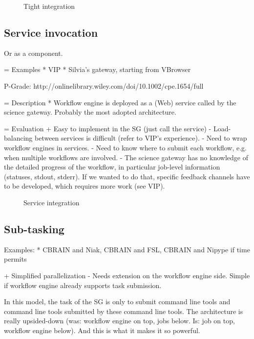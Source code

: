 \documentclass[preprint,3p,twocolumn]{elsarticle}
\begin{document}
\begin{figure}
\centering
\def\svgwidth{0.5\columnwidth}

\label{archi:tight}
\caption{Tight integration}
\end{figure}

\subsection{Service invocation}

Or as a component.

= Examples
* VIP
* Silvia's gateway, starting from VBrowser

P-Grade: http://onlinelibrary.wiley.com/doi/10.1002/cpe.1654/full

= Description 
*  Workflow engine is deployed as a (Web) service called by the
science gateway. Probably the most adopted architecture. 

= Evaluation
+ Easy to implement in the SG (just call the service)
- Load-balancing between services is difficult
(refer to VIP's experience).
- Need to wrap workflow engines in
services.
- Need to know where to submit each workflow, e.g. when
multiple workflows are involved.
- The science gateway has no
knowledge of the detailed progress of the workflow, in particular
job-level information (statuses, stdout, stderr). If we wanted to do
that, specific feedback channels have to be developed, which requires more work (see VIP).

\begin{figure}
\centering
\def\svgwidth{0.5\columnwidth}

\label{archi:service}
\caption{Service integration}
\end{figure}


\subsection{Sub-tasking}

Examples:
* CBRAIN and Niak, CBRAIN and FSL, CBRAIN and Nipype if time permits

+ Simplified parallelization
- Needs extension on the workflow engine side. Simple if workflow engine already supports task submission.

In  this model, the task of the SG is only to submit command line tools and command line tools submitted by these command line tools. The architecture is really upsided-down (was: workflow engine on top, jobs below. Is: job on top, workflow engine below). And this is what it makes it so powerful.
\end{document}
